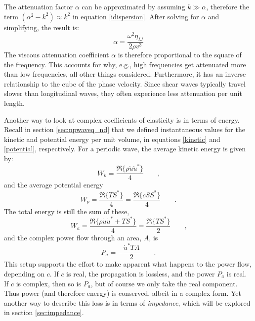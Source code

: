\documentclass[a4paper,10pt]{report}
\numberwithin{equation}{section}
\begin{document}
The attenuation factor $\alpha$ can be approximated by assuming $k \gg \alpha$, therefore the term $(\alpha^2 - k^2) \approx k^2$ in equation \eqref{idispersion}. After solving for $\alpha$ and simplifying, the result is\cite[p.~22]{Ballantine1997}:
\begin{equation}\label{alpha}
 \alpha = \frac{\omega^2\eta_{IJ}}{2\rho v^3}
\end{equation}
The viscous attenuation coefficient $\alpha$ is therefore proportional to the square of the frequency. This accounts for why, e.g., high frequencies get attenuated more than low frequencies, all other things considered. Furthermore, it has an inverse relationship to the cube of the phase velocity. Since shear waves typically travel slower than longitudinal waves, they often experience less attenuation per unit length. 

Another way to look at complex coefficients of elasticity is in terms of energy. Recall in section \ref{sec:npwaveq_nd} that we defined instantaneous values for the kinetic and potential energy per unit volume, in equations \eqref{kinetic} and \eqref{potential}, respectively. For a periodic wave, the average kinetic energy is given by\cite[p.~7]{Kino1987}:
\begin{equation}\label{akinetic}
 W_k = \frac{\Re\{\rho \dot{u} \dot{u}^*\}}{4}\qquad \text{,}
\end{equation}
and the average potential energy
\begin{equation}\label{apotential}
W_p = \frac{\Re\{TS^*\}}{4} = \frac{\Re\{cSS^*\}}{4}\qquad \text{.}
\end{equation}
The total energy is still the sum of these, \cite[p.~7]{Kino1987}
\begin{equation}\label{etotal}
 W_a = \frac{\Re\{\rho \dot{u} \dot{u}^* + TS^*\}}{4} = \frac{\Re\{TS^*\}}{2} \qquad \text{,}
\end{equation}
and the complex power flow through an area, $A$, is
\begin{equation}\label{ptotal}
 P_a = -\frac{\dot{u}^*TA}{2} \qquad \text{.}
\end{equation}
This setup supports the effort to make apparent what happens to the power flow, depending on $c$. If $c$ is real, the propagation is lossless, and the power $P_a$ is real. If $c$ is complex, then so is $P_a$, but of course we only take the real component. Thus power (and therefore energy) is conserved, albeit in a complex form.\cite[p.~8]{Kino1987} Yet another way to describe this loss is in terms of \emph{impedance}, which will be explored in section \ref{sec:impedance}. 
\end{document}

